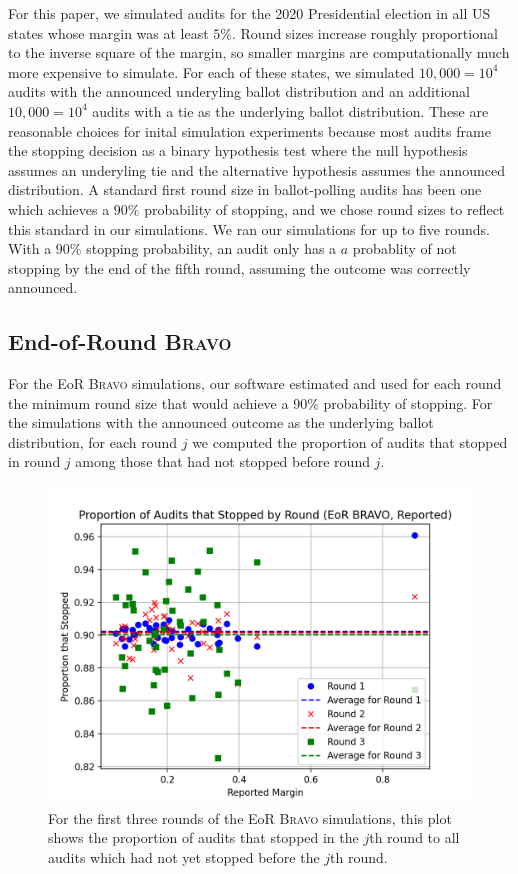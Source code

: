 \documentclass[runningheads]{llncs}
\newcommand{\BRAVO}{\textsc{Bravo}\xspace}
\begin{document}
For this paper, we simulated audits for 
the 2020 Presidential election
in all US states whose margin was at least $5\%$.
Round sizes increase roughly proportional to the inverse
square of the margin, so 
smaller margins are computationally much more expensive to simulate.
For each of these states, we simulated 
$10,000=10^4$ audits with the announced
underyling ballot distribution
and an additional $10,000=10^4$ audits with a tie
as the underlying ballot distribution.
These are reasonable choices for inital simulation experiments
because most audits frame the stopping decision as a binary
hypothesis test where the null hypothesis assumes an underyling tie
and the alternative hypothesis assumes the announced distribution.
A standard first round size in ballot-polling audits
has been one which achieves a $90\%$ probability
of stopping, and we chose round sizes to reflect this standard
in our simulations.
We ran our simulations for up to five rounds.
With a $90\%$ stopping probability, 
an audit only has a $a$ probablity of not stopping
by the end of the fifth round, assuming the outcome was correctly
announced.

\subsection{End-of-Round \BRAVO}
For the EoR \BRAVO simulations, our software estimated and used for each round
the minimum round size that would achieve a $90\%$ probability of stopping.
For the simulations with the announced outcome as the underlying
ballot distribution, for each round $j$ we computed the proportion of audits 
that stopped in round $j$ among those that had not stopped before round $j$.

\begin{figure}[H]
\includegraphics[width=\textwidth]{eor_bravo_90perc_10^4_corrected/sprob_first_three.png}\caption{
For the first three rounds of the EoR \BRAVO simulations, this plot shows the proportion of audits that stopped in the $j$th round
to all audits which had not yet stopped before the $j$th round.}
\label{fig:eor_bravo_sprob}
\end{figure}
\end{document}
